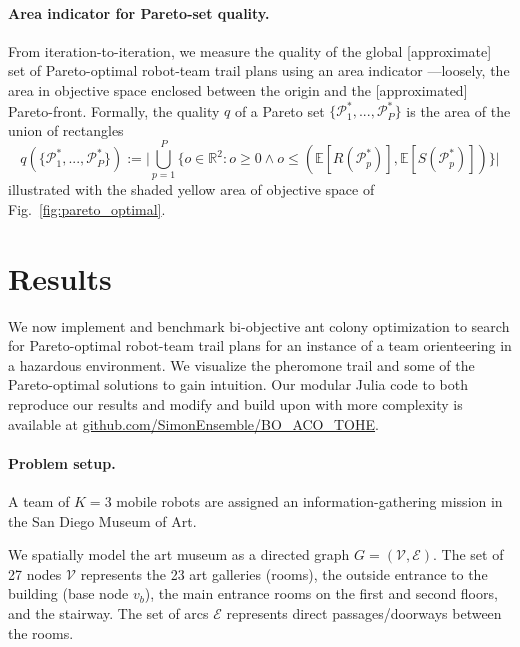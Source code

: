 \documentclass[11pt, oneside]{article}
\begin{document}
\paragraph{Area indicator for Pareto-set quality.}
From iteration-to-iteration, we measure the quality of the global [approximate] set of Pareto-optimal robot-team trail plans using an area indicator \cite{cao2015using,guerreiro2020hypervolume}---loosely, the area in objective space enclosed between the origin and the [approximated] Pareto-front. Formally, the quality $q$ of a Pareto set $\{\mathcal{P}^*_1, ...,\mathcal{P}^*_P\}$ is the area of the union of rectangles
\begin{equation}
	q(\{\mathcal{P}^*_1, ...,\mathcal{P}^*_{P}\}):=
	\Big \lvert 
		\bigcup_{p=1}^P \{ o \in \mathbb{R}^2 : o \geq 0 \wedge  o \leq (\mathbb{E}[R(\mathcal{P}^*_p)], \mathbb{E}[S(\mathcal{P}^*_p)]) \} 
	\Big \rvert \label{eq:q}
\end{equation}
illustrated with the shaded yellow area of objective space of Fig.~\ref{fig:pareto_optimal}.

\section{Results}
We now implement and benchmark bi-objective ant colony optimization to search for Pareto-optimal robot-team trail plans for an instance of a team orienteering in a hazardous environment. 
We visualize the pheromone trail and some of the Pareto-optimal solutions to gain intuition. 
Our modular Julia code to both reproduce our results and modify and build upon with more complexity is available at \url{github.com/SimonEnsemble/BO_ACO_TOHE}.

\paragraph{Problem setup.} 
A team of $K=3$ mobile robots are assigned an information-gathering mission in the San Diego Museum of Art. 

We spatially model the art museum as a directed graph $G=(\mathcal{V}, \mathcal{E})$.
The set of 27 nodes $\mathcal{V}$ represents the 23 art galleries (rooms), the outside entrance to the building (base node $v_b$), the main entrance rooms on the first and second floors, and the stairway.
The set of arcs $\mathcal{E}$ represents direct passages/doorways between the rooms. %
\end{document}
